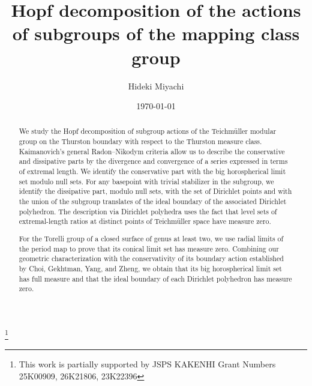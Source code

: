 \documentclass[dvipdfmx]{amsart}
\theoremstyle{remark}
\begin{document}




\title[Hopf decomposition]{Hopf decomposition of the actions of subgroups of the mapping class group}
\author{Hideki Miyachi}


\date{\today}
\address{School of Mathematics and Physics,
College of Science and Engineering,
Kanazawa University,
Kakuma-machi, Kanazawa,
Ishikawa, 920-1192, Japan
}
\thanks{This work is partially supported by JSPS KAKENHI Grant Numbers
25K00909,
26K21806,
23K22396 }


\begin{abstract}
We study the Hopf decomposition of subgroup actions of the
Teichm\"uller modular group on the Thurston boundary with respect to the Thurston measure class. Kaimanovich's general
Radon--Nikodym criteria allow us to describe the conservative and dissipative parts by the divergence and convergence of a series expressed in terms of extremal length. We identify the conservative part with the big horospherical limit set modulo null sets. For any basepoint with trivial stabilizer in the subgroup, we identify the dissipative part, modulo null sets, with the set of Dirichlet points and with the union of the subgroup translates of the ideal boundary of the associated
Dirichlet polyhedron. The description via Dirichlet polyhedra uses the fact that level sets of extremal-length ratios at distinct points of Teichm\"uller space have measure zero.

For the Torelli group of a closed surface of genus at least two, we use radial limits of the period map to prove that its conical limit set has measure zero. Combining our geometric characterization with the conservativity of its boundary action established by Choi, Gekhtman, Yang, and Zheng, we obtain that its big horospherical limit set has full measure and that the ideal boundary of each Dirichlet polyhedron has measure zero.
\end{abstract}




\maketitle
\tableofcontents


\end{document}
